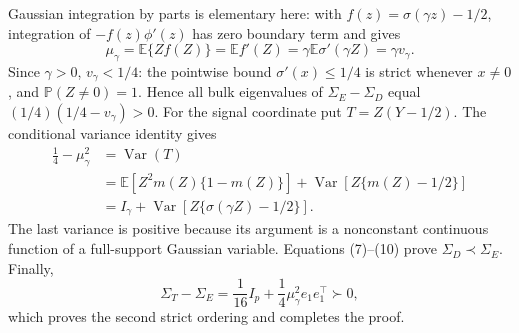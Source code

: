 Gaussian integration by parts is elementary here: with \(f(z)=\sigma(\gamma z)-1/2\), integration of \(-f(z)\phi'(z)\) has zero boundary term and gives
\[
 \mu_\gamma=\mathbb E\{Zf(Z)\}=\mathbb E f'(Z)
 =\gamma\mathbb E\sigma'(\gamma Z)=\gamma v_\gamma.
 \tag{9}
\]
Since \(\gamma>0\), \(v_\gamma<1/4\): the pointwise bound \(\sigma'(x)\le1/4\) is strict whenever \(x\ne0\), and \(\mathbb P(Z\ne0)=1\).  Hence all bulk eigenvalues of \(\Sigma_E-\Sigma_D\) equal \((1/4)(1/4-v_\gamma)>0\).  For the signal coordinate put \(T=Z(Y-1/2)\).  The conditional variance identity gives
\[
 \begin{aligned}
 \frac14-\mu_\gamma^2
 &=\operatorname{Var}(T)\\
 &=\mathbb E\!\left[Z^2m(Z)\{1-m(Z)\}\right]
   +\operatorname{Var}\!\left[Z\{m(Z)-1/2\}\right]\\
 &=I_\gamma+\operatorname{Var}\!\left[Z\{\sigma(\gamma Z)-1/2\}\right].
 \end{aligned}
 \tag{10}
\]
The last variance is positive because its argument is a nonconstant continuous function of a full-support Gaussian variable.  Equations (7)--(10) prove \(\Sigma_D\prec\Sigma_E\).  Finally,
\[
 \Sigma_T-\Sigma_E=\frac1{16}I_p+\frac14\mu_\gamma^2e_1e_1^\top\succ0,
\]
which proves the second strict ordering and completes the proof.

